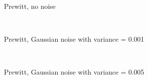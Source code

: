 \begin{figure}
  \centering
     \\
  \caption{Prewitt, no noise}
  \label{fig:prewitt_no_noise}
\end{figure}

\begin{figure}
  \centering
     \\
  \caption{Prewitt, Gaussian noise with variance = 0.001}
  \label{fig:prewitt_001}
\end{figure}

\begin{figure}
  \centering
     \\
  \caption{Prewitt, Gaussian noise with variance = 0.005}
  \label{fig:prewitt_005}
\end{figure}